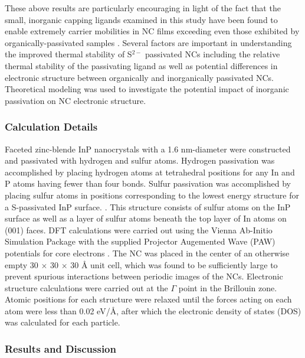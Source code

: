 These above results are particularly encouraging in light of the fact that the small, inorganic capping ligands examined in this study have been found to enable extremely carrier mobilities in NC films exceeding even those exhibited by organically-passivated samples \cite{talapin2009prospects, lee2011band}. Several factors are important in understanding the improved thermal stability of S$^{2-}$ passivated NCs including the relative thermal stability of the passivating ligand as well as potential differences in electronic structure between organically and inorganically passivated NCs. Theoretical modeling was used to investigate the potential impact of inorganic passivation on NC electronic structure.

\subsubsection{Calculation Details}
Faceted zinc-blende InP nanocrystals with a 1.6 nm-diameter were constructed and passivated with hydrogen and sulfur atoms. Hydrogen passivation was accomplished by placing hydrogen atoms at tetrahedral positions for any In and P atoms having fewer than four bonds. Sulfur passivation was accomplished by placing sulfur atoms in positions corresponding to the lowest energy structure for a S-passivated InP surface. \cite{deng2010surface}. This structure consists of sulfur atoms on the InP surface as well as a layer of sulfur atoms beneath the top layer of In atoms on (001) faces. DFT calculations were carried out using the Vienna Ab-Initio Simulation Package \cite{PhysRevB.54.11169} with the supplied Projector Augemented Wave (PAW) potentials for core electrons \cite{kresse1999ultrasoft}. The NC was placed in the center of an otherwise empty 30 $\times$ 30 $\times$ 30 \r{A} unit cell, which was found to be sufficiently large to prevent spurious interactions between periodic images of the NCs. Electronic structure calculations were carried out at the $\Gamma$ point in the Brillouin zone. Atomic positions for each structure were relaxed until the forces acting on each atom were less than 0.02 eV/\r{A}, after which the electronic density of states (DOS) was calculated for each particle.

\subsubsection{Results and Discussion}

